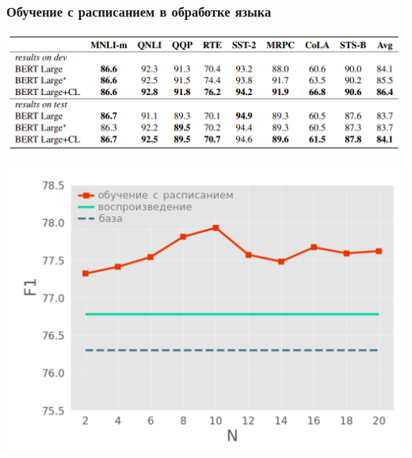 \documentclass{beamer}
\begin{document}
\begin{frame}
	\frametitle{Обучение с расписанием в обработке языка}
	\begin{center}
		\includegraphics[scale=0.3]{acl20_results}
	\end{center}

	\begin{center}
		\includegraphics[scale=0.45]{acl20_results2}
	\end{center}

\end{frame}
\end{document}
